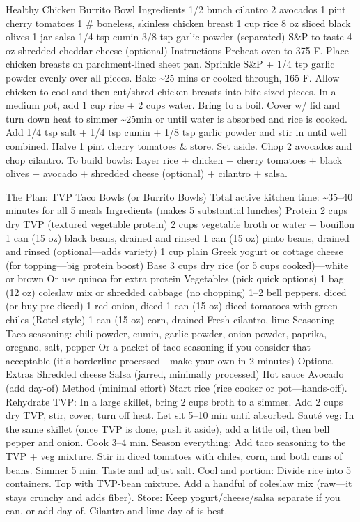 Healthy Chicken Burrito Bowl Ingredients 1/2 bunch cilantro 2 avocados 1 pint cherry tomatoes 1 \# boneless, skinless chicken breast 1 cup rice 8 oz sliced black olives 1 jar salsa 1/4 tsp cumin 3/8 tsp garlic powder (separated) S\&P to taste 4 oz shredded cheddar cheese (optional) Instructions Preheat oven to 375 F. Place chicken breasts on parchment-lined sheet pan. Sprinkle S\&P + 1/4 tsp garlic powder evenly over all pieces. Bake \~{}25 mins or cooked through, 165 F. Allow chicken to cool and then cut/shred chicken breasts into bite-sized pieces. In a medium pot, add 1 cup rice + 2 cups water. Bring to a boil. Cover w/ lid and turn down heat to simmer \~{}25min or until water is absorbed and rice is cooked. Add 1/4 tsp salt + 1/4 tsp cumin + 1/8 tsp garlic powder and stir in until well combined. Halve 1 pint cherry tomatoes \& store. Set aside. Chop 2 avocados and chop cilantro. To build bowls: Layer rice + chicken + cherry tomatoes + black olives + avocado + shredded cheese (optional) + cilantro + salsa.
\par

The Plan: TVP Taco Bowls (or Burrito Bowls) Total active kitchen time: \~{}35–40 minutes for all 5 meals Ingredients (makes 5 substantial lunches) Protein 2 cups dry TVP (textured vegetable protein) 2 cups vegetable broth or water + bouillon 1 can (15 oz) black beans, drained and rinsed 1 can (15 oz) pinto beans, drained and rinsed (optional—adds variety) 1 cup plain Greek yogurt or cottage cheese (for topping—big protein boost) Base 3 cups dry rice (or 5 cups cooked)—white or brown Or use quinoa for extra protein Vegetables (pick quick options) 1 bag (12 oz) coleslaw mix or shredded cabbage (no chopping) 1–2 bell peppers, diced (or buy pre-diced) 1 red onion, diced 1 can (15 oz) diced tomatoes with green chiles (Rotel-style) 1 can (15 oz) corn, drained Fresh cilantro, lime Seasoning Taco seasoning: chili powder, cumin, garlic powder, onion powder, paprika, oregano, salt, pepper Or a packet of taco seasoning if you consider that acceptable (it's borderline processed—make your own in 2 minutes) Optional Extras Shredded cheese Salsa (jarred, minimally processed) Hot sauce Avocado (add day-of) Method (minimal effort) Start rice (rice cooker or pot—hands-off). Rehydrate TVP: In a large skillet, bring 2 cups broth to a simmer. Add 2 cups dry TVP, stir, cover, turn off heat. Let sit 5–10 min until absorbed. Sauté veg: In the same skillet (once TVP is done, push it aside), add a little oil, then bell pepper and onion. Cook 3–4 min. Season everything: Add taco seasoning to the TVP + veg mixture. Stir in diced tomatoes with chiles, corn, and both cans of beans. Simmer 5 min. Taste and adjust salt. Cool and portion: Divide rice into 5 containers. Top with TVP-bean mixture. Add a handful of coleslaw mix (raw—it stays crunchy and adds fiber). Store: Keep yogurt/cheese/salsa separate if you can, or add day-of. Cilantro and lime day-of is best.
\par


